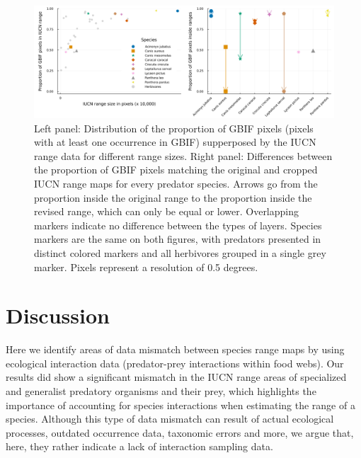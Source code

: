\documentclass[10pt,oneside]{article}
\makeatletter
\def\maxwidth{\ifdim\Gin@nat@width>\linewidth\linewidth
\else\Gin@nat@width\fi}
\let\Oldincludegraphics\includegraphics
\renewcommand{\includegraphics}[1]{\Oldincludegraphics[width=\maxwidth]{#1}}
\makeatother
\begin{document}
\begin{figure}
\hypertarget{fig:gbif}{%
\centering
\includegraphics{figures/gbif_panels.png}
\caption{Left panel: Distribution of the proportion of GBIF pixels
(pixels with at least one occurrence in GBIF) supperposed by the IUCN
range data for different range sizes. Right panel: Differences between
the proportion of GBIF pixels matching the original and cropped IUCN
range maps for every predator species. Arrows go from the proportion
inside the original range to the proportion inside the revised range,
which can only be equal or lower. Overlapping markers indicate no
difference between the types of layers. Species markers are the same on
both figures, with predators presented in distinct colored markers and
all herbivores grouped in a single grey marker. Pixels represent a
resolution of 0.5 degrees.}\label{fig:gbif}
}
\end{figure}

\hypertarget{discussion}{%
\section{Discussion}\label{discussion}}

Here we identify areas of data mismatch between species range maps by
using ecological interaction data (predator-prey interactions within
food webs). Our results did show a significant mismatch in the IUCN
range areas of specialized and generalist predatory organisms and their
prey, which highlights the importance of accounting for species
interactions when estimating the range of a species. Although this type
of data mismatch can result of actual ecological processes, outdated
occurrence data, taxonomic errors and more, we argue that, here, they
rather indicate a lack of interaction sampling data.
\end{document}
